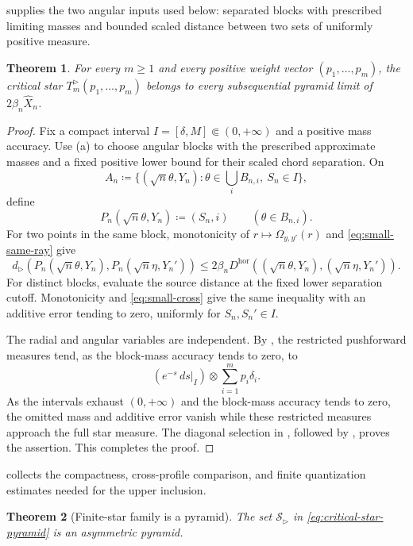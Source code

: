 \documentclass{amsart}
\numberwithin{equation}{section}
\theoremstyle{plain}
\newtheorem{theorem}{Theorem}[section]
\theoremstyle{definition}
\theoremstyle{remark}
\begin{document}
 supplies the two angular inputs used below: separated blocks with prescribed limiting masses and bounded scaled distance between two sets of uniformly positive measure.

\begin{theorem}\label{thm:finite-star-lower}
For every $m\ge1$ and every positive weight vector $(p_1,\ldots,p_m)$, the critical star $T_m^{\rhd}(p_1,\ldots,p_m)$ belongs to every subsequential pyramid limit of $2\beta_n\widehat X_n$.
\end{theorem}

\begin{proof}
Fix a compact interval $I=[\delta,M]\Subset(0,+\infty)$ and a positive mass accuracy.  Use (a) to choose angular blocks with the prescribed approximate masses and a fixed positive lower bound for their scaled chord separation.  On
\[ A_n\coloneqq\{(\sqrt n\theta,Y_n)\colon \theta\in\textstyle\bigcup_iB_{n,i},\ S_n\in I\}, \]
define
\[ P_n(\sqrt n\theta,Y_n)\coloneqq(S_n,i) \qquad(\theta\in B_{n,i}). \]
For two points in the same block, monotonicity of $r\mapsto\Omega_{y,y'}(r)$ and \eqref{eq:small-same-ray} give
\[ d_{\rhd}(P_n(\sqrt n\theta,Y_n),P_n(\sqrt n\eta,Y_n')) \le2\beta_nD^{\mathrm{hor}}((\sqrt n\theta,Y_n),(\sqrt n\eta,Y_n')). \]
For distinct blocks, evaluate the source distance at the fixed lower separation cutoff.  Monotonicity and \eqref{eq:small-cross} give the same inequality with an additive error tending to zero, uniformly for $S_n,S_n'\in I$.

The radial and angular variables are independent.  By , the restricted pushforward measures tend, as the block-mass accuracy tends to zero, to
\[ (e^{-s}\,ds|_I)\otimes\sum_{i=1}^mp_i\delta_i. \]
As the intervals exhaust $(0,+\infty)$ and the block-mass accuracy tends to zero, the omitted mass and additive error vanish while these restricted measures approach the full star measure.  The diagonal selection in , followed by , proves the assertion.
	This completes the proof.
\end{proof}

 collects the compactness, cross-profile comparison, and finite quantization estimates needed for the upper inclusion.

\begin{theorem}[Finite-star family is a pyramid]\label{thm:finite-star-pyramid}
The set $\mathcal S_{\rhd}$ in \eqref{eq:critical-star-pyramid} is an asymmetric pyramid.
\end{theorem}
\end{document}
